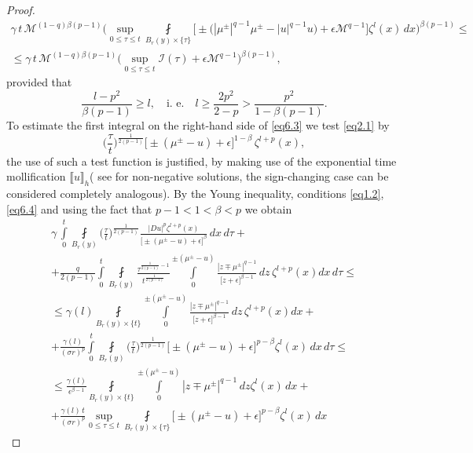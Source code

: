 \documentclass[a4paper,11pt,fullpage]{article}
\numberwithin{equation}{section}
\begin{document}
\begin{proof}
\begin{multline}
\gamma\,t\,\mathcal{M}^{(1-q)\beta(p-1)}\bigg(\sup\limits_{0\leqslant \tau\leqslant t}\fint\limits_{B_{r}(y)\times\{\tau\}}
\Big[\pm\big(|\mu^{\pm}|^{q-1}\mu^{\pm}-|u|^{q-1}u\big)+\epsilon \mathcal{M}^{q-1}\Big]\zeta^{l}(x)\,dx \bigg)^{\beta(p-1)}
\leqslant\\\leqslant
\gamma\,t\,\mathcal{M}^{(1-q)\beta(p-1)}\Big(\sup\limits_{0\leqslant \tau\leqslant t}\mathcal{I}(\tau)+\epsilon \mathcal{M}^{q-1}\Big)^{\beta(p-1)},
\end{multline}
provided that
$$\frac{l-p^2}{\beta(p-1)}\geqslant l,\quad \text{i. e.}\quad l\geqslant \frac{2 p^2}{2-p}>\frac{p^2}{1-\beta(p-1)}.$$
To estimate the first integral on the right-hand side of \eqref{eq6.3} we test \eqref{eq2.1} by
$$\Big(\frac{\tau}{t}\Big)^{\frac{1}{2(p-1)}} \big[\pm(\mu^{\pm}-u)+\epsilon\big]^{1-\beta}\,\zeta^{l+p}(x),$$
the use of such a test function is justified,  by making use of the
exponential time mollification  $\llbracket u \rrbracket_h$( see \cite[Chapter 7.1]{Bog3}  for non-negative solutions, the sign-changing case can be considered completely analogous).  By the Young inequality, conditions \eqref{eq1.2}, \eqref{eq6.4} and using the fact that $p-1< 1<
\beta <p$ we obtain
\begin{multline}\label{eq6.6}
\gamma\,\int\limits^t_0\fint\limits_{B_{r}(y)}\Big(\frac{\tau}{t}\Big)^{\frac{1}{2(p-1)}} \frac{|D u|^{p}\zeta^{l+p}(x)}{\big[\pm(\mu^{\pm}-u)+\epsilon\big]^{\beta}} \,dx\,d\tau+\\+\frac{q}{2(p-1)}\int\limits^t_0\fint\limits_{B_r(y)}
\frac{\tau^{\frac{1}{2(p-1)}-1}}{t^{\frac{1}{2(p-1)}}}
\int\limits_0^{\pm(\mu^{\pm}-u)}\frac{|z\mp \mu^{\pm}|^{q-1}}{\big[z+\epsilon\big]^{\beta-1}}\,dz\,\zeta^{l+p}(x) dx\,d\tau
\leqslant\\\leqslant \gamma(l) \fint\limits_{B_{r}(y)\times\{t\}}
\int\limits_0^{\pm(\mu^{\pm}-u)}\frac{|z\mp \mu^{\pm}|^{q-1}}{\big[z+\epsilon\big]^{\beta-1}}\,dz\,\zeta^{l+p}(x) dx+\\+
\frac{\gamma(l)}{(\sigma r)^p}\int\limits^t_0\fint\limits_{B_{r}(y)}\Big(\frac{\tau}{t}\Big)^{\frac{1}{2(p-1)}}\big[\pm(\mu^{\pm}-u)+\epsilon\big]^{p-\beta}\zeta^{l}(x)
\,dx\,d\tau
\leqslant\\\leqslant \frac{\gamma(l)}{\epsilon^{\beta-1}}\fint\limits_{B_{r}(y)\times\{t\}}
\int\limits_0^{\pm(\mu^{\pm}-u)}|z\mp \mu^{\pm}|^{q-1}\,dz\zeta^l(x)\, dx+\\+\frac{\gamma(l)\,t}{(\sigma r)^p}\sup\limits_{0\leqslant \tau\leqslant t}\fint\limits_{B_{r}(y)\times\{\tau\}}\big[\pm(\mu^{\pm}-u)+\epsilon\big]^{p-\beta}\zeta^l(x)\,dx

\end{multline}
\end{proof}
\end{document}
